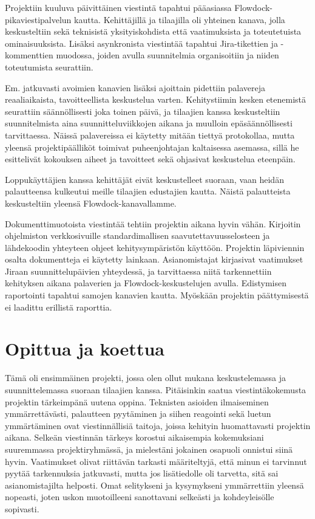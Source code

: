 \documentclass[11pt]{article}
\begin{document}
Projektiin kuuluva päivittäinen viestintä tapahtui pääasiassa
Flowdock-pikaviestipalvelun kautta. Kehittäjillä ja tilaajilla oli yhteinen
kanava, jolla keskusteltiin sekä teknisistä yksityiskohdista että vaatimuksista
ja toteutetuista ominaisuuksista. Lisäksi asynkronista vies\-tintää tapahtui
Jira-tikettien ja -kommenttien muodossa, joiden avulla suun\-nitelmia orga\-ni\-soitiin
ja niiden toteutumista seurattiin.

Em. jatkuvasti avoimien kanavien lisäksi ajoittain pidettiin palavereja
reaaliaikaista, tavoitteellista keskustelua varten. Kehitystiimin kesken
etenemistä seurattiin säännöllisesti joka toinen päivä, ja tilaajien kanssa
keskusteltiin suunnitelmista aina suunnitteluviikkojen ai\-ka\-na ja muulloin
epäsäännöllisesti tarvittaessa. Näissä palavereissa ei käytetty mitään tiettyä
protokollaa, mutta yleensä projektipäälliköt toimivat puheenjohtajan
kaltaisessa asemassa, sillä he esittelivät kokouksen aiheet ja tavoitteet sekä
ohjasivat keskustelua eteenpäin.

Loppukäyttäjien kanssa kehittäjät eivät keskustelleet suoraan, vaan heidän
palautteensa kulkeutui meille tilaajien edustajien kautta. Näistä palautteista
keskusteltiin yleensä Flow\-dock-kanavallamme.

Dokumenttimuotoista viestintää tehtiin projektin aikana hyvin vähän. Kirjoitin
ohjelmiston verkkosivuille standardimallisen saavutettavuusselosteen ja
lähdekoodin yhteyteen ohjeet kehitys\-ympä\-ris\-tön käyttöön. Projektin läpiviennin
osalta dokumentteja ei käytetty lain\-kaan. Asianomistajat kirjasivat vaatimukset
Jiraan suunnittelupäivien yhteydessä, ja tarvit\-taes\-sa niitä tarkennettiin
kehi\-tyk\-sen aikana palaverien ja Flow\-dock-keskustelujen avulla.
Edistymisen raportointi tapahtui samo\-jen kanavien kautta. Myöskään projektin
päättymi\-ses\-tä ei laadittu erillistä raporttia.

\section{Opittua ja koettua}

Tämä oli ensimmäinen projekti, jossa olen ollut mukana keskustelemassa ja
suunnittelemassa suoraan tilaajien kanssa. Pitäisinkin saatua viestintäkokemusta
projektin tärkeimpänä uutena oppina. Teknisten asioiden ilmaiseminen
ymmärrettävästi, palautteen pyytä\-minen ja siihen reagointi sekä luetun
ymmärtäminen ovat viestinnällisiä taitoja, joissa kehityin huomattavasti
projektin aikana. Sel\-keän viestinnän tärkeys korostui aikaisempia
kokemuksiani suuremmassa projektiryhmässä, ja mie\-les\-tä\-ni jokainen
osapuoli onnistui sii\-nä hyvin. Vaatimukset olivat riittävän tarkasti määriteltyjä,
että minun ei tarvinnut pyytää tarkennuksia jatkuvasti, mutta jos lisätiedolle
oli tarvetta, sitä sai asianomistajilta helposti. Omat selitykseni ja
kysymykseni ymmärrettiin yleensä nopeasti, joten uskon muotoilleeni sa\-not\-tavani
selkeästi ja kohdeyleisölle sopivasti.
\end{document}
